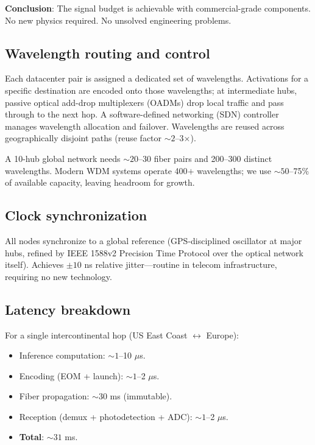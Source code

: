 \documentclass[12pt]{article}
\begin{document}
\noindent \textbf{Conclusion}: The signal budget is achievable with commercial-grade
components. No new physics required. No unsolved engineering problems.

\subsection{Wavelength routing and control}

Each datacenter pair is assigned a dedicated set of wavelengths. Activations for
a specific destination are encoded onto those wavelengths; at intermediate hubs,
passive optical add-drop multiplexers (OADMs) drop local traffic and pass through
to the next hop. A software-defined networking (SDN) controller manages
wavelength allocation and failover. Wavelengths are reused across geographically
disjoint paths (reuse factor \(\sim\!2\)--3$\times$).

A 10-hub global network needs \(\sim\!20\)--30 fiber pairs and 200--300 distinct
wavelengths. Modern WDM systems operate 400$+$ wavelengths; we use \(\sim\!50\)--75\% of
available capacity, leaving headroom for growth.

\subsection{Clock synchronization}

All nodes synchronize to a global reference (GPS-disciplined oscillator at major
hubs, refined by IEEE 1588v2 Precision Time Protocol over the optical network
itself). Achieves \(\pm\!10\) ns relative jitter---routine in telecom
infrastructure, requiring no new technology.

\subsection{Latency breakdown}

For a single intercontinental hop (US East Coast $\leftrightarrow$ Europe):
\begin{itemize}[leftmargin=1.6em,itemsep=2pt]
  \item Inference computation: \(\sim\!1\)--10 \(\mu\)s.
  \item Encoding (EOM + launch): \(\sim\!1\)--2 \(\mu\)s.
  \item Fiber propagation: \(\sim\!30\) ms (immutable).
  \item Reception (demux + photodetection + ADC): \(\sim\!1\)--2 \(\mu\)s.
  \item \textbf{Total}: \(\sim\!31\) ms.
\end{itemize}
\end{document}
